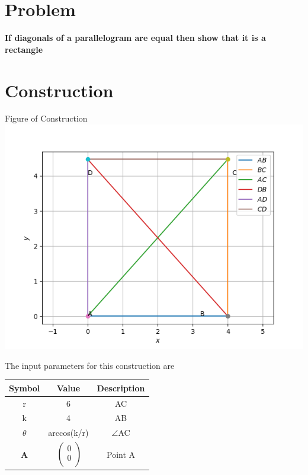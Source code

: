 \documentclass[10pt, a4paper]{article}
\begin{document}
\title{\mytitle}
\author{\myauthor\hspace{1em}\\\contact\\FWC22008\hspace{6.5em}IITH\hspace{0.5em}\mymodule\hspace{6em}ASSIGN-4}
\date{}
	\maketitle
		
	\tableofcontents
\vspace{5mm}
   \section{Problem}
\textbf{ If diagonals of a parallelogram are equal then show that it is a rectangle }
 \section{Construction}
 	\begin{center}
     Figure of Construction
     \includegraphics[scale=0.5]{fig.png}
  	\end{center}
  	The input parameters for this construction are 
\begin{center}
\begin{tabular}{|c|c|c|}
	\hline
	\textbf{Symbol}&\textbf{Value}&\textbf{Description}\\
	\hline
	r&6&AC\\
	\hline
	k&4&AB\\ 
	\hline
	${\theta}$& arccos(k/r)&$ \angle $AC\\
	\hline
	\textbf{A}&$\
	\begin{pmatrix}
		0 \\
		0 \\
	\end{pmatrix}$
	&Point A\\
	\hline
	
\end{tabular}
\end{center}
\end{document}
